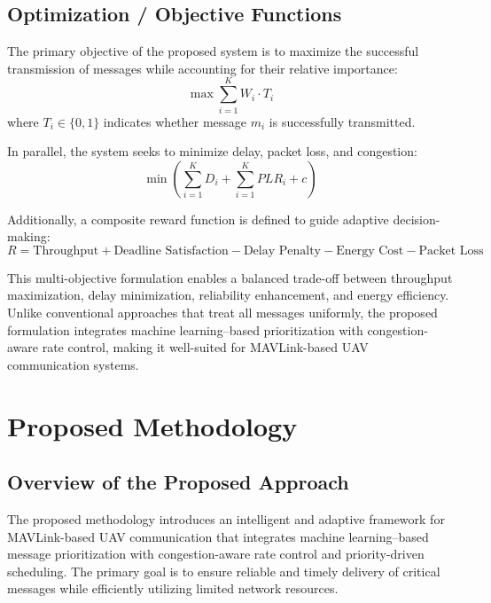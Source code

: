 \documentclass[pdflatex,sn-mathphys-num]{sn-jnl}%
\theoremstyle{thmstyleone}%
\theoremstyle{thmstyletwo}%
\theoremstyle{thmstylethree}%
\begin{document}
\subsection{ Optimization / Objective Functions }

The primary objective of the proposed system is to maximize the successful transmission of messages while accounting for their relative importance:
\begin{equation}
\max \sum_{i=1}^{K} W_i \cdot T_i
\label{eq:objective_max}
\end{equation}
where $T_i \in \{0,1\}$ indicates whether message $m_i$ is successfully transmitted.

In parallel, the system seeks to minimize delay, packet loss, and congestion:
\begin{equation}
\min \left( \sum_{i=1}^{K} D_i + \sum_{i=1}^{K} PLR_i + c \right)
\label{eq:objective_min}
\end{equation}

Additionally, a composite reward function is defined to guide adaptive decision-making:
\begin{equation}
R = \text{Throughput} + \text{Deadline Satisfaction} - \text{Delay Penalty} - \text{Energy Cost} - \text{Packet Loss}
\label{eq:reward_function}
\end{equation}

This multi-objective formulation enables a balanced trade-off between throughput maximization, delay minimization, reliability enhancement, and energy efficiency. Unlike conventional approaches that treat all messages uniformly, the proposed formulation integrates machine learning–based prioritization with congestion-aware rate control, making it well-suited for MAVLink-based UAV communication systems.


\section{ Proposed Methodology }

\subsection{ Overview of the Proposed Approach }

The proposed methodology introduces an intelligent and adaptive framework for MAVLink-based UAV communication that integrates machine learning–based message prioritization with congestion-aware rate control and priority-driven scheduling. The primary goal is to ensure reliable and timely delivery of critical messages while efficiently utilizing limited network resources.
\end{document}
